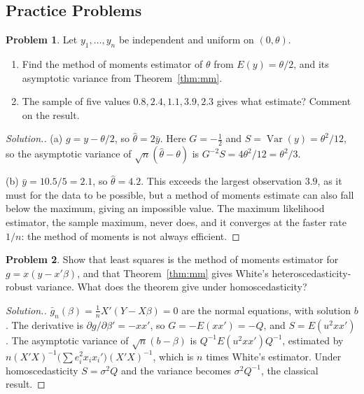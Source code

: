 \documentclass[11pt,a4paper]{article}
\numberwithin{equation}{section}
\DeclareMathOperator{\Var}{Var}
\theoremstyle{definition}
\newtheorem{problemx}{Problem}[subsection]
\newenvironment{problem}{\begin{problemx}}{\end{problemx}}
\newenvironment{solution}
  {\renewcommand{\qedsymbol}{}\begin{proof}[\textit{Solution}.]}
  {\end{proof}}
\begin{document}
\subsection{Practice Problems}

\begin{problem}
Let $y_1, \dots, y_n$ be independent and uniform on $(0, \theta)$.
\begin{enumerate}[label=(\alph*)]
\item Find the method of moments estimator of $\theta$ from $E(y) = \theta/2$, and its asymptotic variance from Theorem~\ref{thm:mm}.
\item The sample of five values $0.8, 2.4, 1.1, 3.9, 2.3$ gives what estimate? Comment on the result.
\end{enumerate}
\end{problem}

\begin{solution}
(a) $g = y - \theta/2$, so $\hat\theta = 2\bar y$. Here $G = -\frac12$ and $S = \Var(y) = \theta^2/12$, so the asymptotic variance of $\sqrt n(\hat\theta - \theta)$ is $G^{-2}S = 4\theta^2/12 = \theta^2/3$.

(b) $\bar y = 10.5/5 = 2.1$, so $\hat\theta = 4.2$. This exceeds the largest observation $3.9$, as it must for the data to be possible, but a method of moments estimate can also fall below
the maximum, giving an impossible value. The maximum likelihood estimator, the sample maximum, never does, and it converges at the faster rate $1/n$: the
method of moments is not always efficient.
\end{solution}

\begin{problem}
Show that least squares is the method of moments estimator for $g = x(y - x'\beta)$, and that Theorem~\ref{thm:mm} gives White's heteroscedasticity-robust variance.
What does the theorem give under homoscedasticity?
\end{problem}

\begin{solution}
$\bar g_n(\beta) = \frac1nX'(Y - X\beta) = 0$ are the normal equations, with solution $b$. The derivative is $\partial g/\partial\beta' = -xx'$, so $G = -E(xx') = -Q$, and $S = E(u^2xx')$. The
asymptotic variance of $\sqrt n(b - \beta)$ is $Q^{-1}E(u^2xx')Q^{-1}$, estimated by $n(X'X)^{-1}\bigl(\sum e_i^2x_ix_i'\bigr)(X'X)^{-1}$, which is $n$ times White's estimator. Under homoscedasticity
$S = \sigma^2Q$ and the variance becomes $\sigma^2Q^{-1}$, the classical result.
\end{solution}
\end{document}
